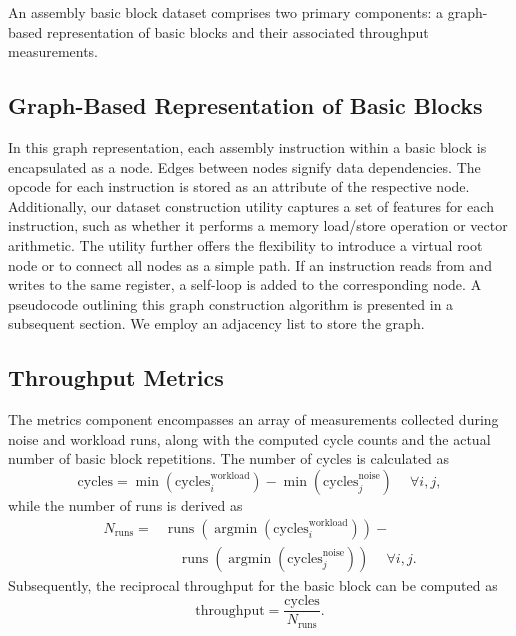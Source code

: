 An assembly basic block dataset comprises two primary components: a graph-based representation of 
basic blocks and their associated throughput measurements.

\subsection{Graph-Based Representation of Basic Blocks}

In this graph representation, each assembly instruction within a basic block is encapsulated as a 
node. Edges between nodes signify data dependencies. The opcode for each instruction is stored as 
an attribute of the respective node. Additionally, our dataset construction utility captures a set 
of features for each instruction, such as whether it performs a memory load/store operation or vector 
arithmetic. The utility further offers the flexibility to introduce a virtual root node or to connect 
all nodes as a simple path. If an instruction reads from and writes to the same register, a 
self-loop is added to the corresponding node. A pseudocode outlining this graph construction algorithm
is presented in a subsequent section. We employ an adjacency list to store the graph.

\subsection{Throughput Metrics}

The metrics component encompasses an array of measurements collected during noise and workload runs, 
along with the computed cycle counts and the actual number of basic block repetitions. The number of 
cycles is calculated as
\[\mathrm{cycles} = \operatorname{min}(\mathrm{cycles}^{\mathrm{workload}}_i) - \operatorname{min}(\mathrm{cycles}^{\mathrm{noise}}_j) \quad ~\forall i, j,\] while the number of runs 
is derived as 
\begin{equation*}
\begin{split}
N_{\mathrm{runs}} = &\operatorname{runs}(\operatorname{argmin}(\mathrm{cycles}^{\mathrm{workload}}_i)) - \\
  &\quad \operatorname{runs}(\operatorname{argmin}(\mathrm{cycles}^{\mathrm{noise}}_j)) \quad ~\forall i, j.
\end{split}
\end{equation*}
Subsequently, the reciprocal throughput for the basic block can be computed as 
\[\mathrm{throughput} = \frac{\mathrm{cycles}}{N_{\mathrm{runs}}}.\]


